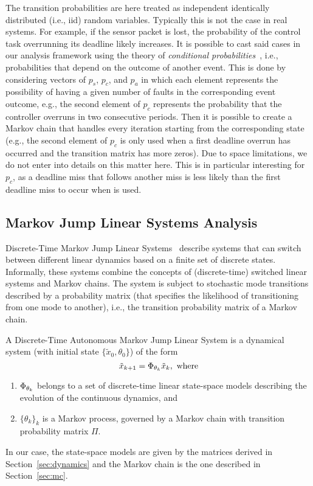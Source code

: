 The transition probabilities are here treated as independent identically distributed (i.e., iid) random variables.
Typically this is not the case in real systems.
For example, if the sensor packet is lost, the probability of the control task overrunning its deadline likely increases.
It is possible to cast said cases in our analysis framework using the theory of \emph{conditional probabilities}~\cite{Dekking:2006}, i.e., probabilities that depend on the outcome of another event.
This is done by considering vectors of $p_s$, $p_c$, and $p_a$ in which each element represents the possibility of having a given number of faults in the corresponding event outcome, e.g., the second element of $p_c$ represents the probability that the controller overruns in two consecutive periods.
Then it is possible to create a Markov chain that handles every iteration starting from the corresponding state (e.g., the second element of $p_c$ is only used when a first deadline overrun has occurred and the transition matrix has more zeros).
Due to space limitations, we do not enter into details on this matter here.
This is in particular interesting for $p_c$, as a deadline miss that follows another miss is less likely than the first deadline miss to occur when \tS{} is used.

\subsection{Markov Jump Linear Systems Analysis}%
\label{sec:mjls}%

Discrete-Time Markov Jump Linear Systems~\cite{Costa:2005} describe systems that can switch between different linear dynamics based on a finite set of discrete states.
Informally, these systems combine the concepts of (discrete-time) switched linear systems and Markov chains.
The system is subject to stochastic mode transitions described by a probability matrix (that specifies the likelihood of transitioning from one mode to another), i.e., the transition probability matrix of a Markov chain.
%
\begin{definition}%
    \label{def:mjls}%
    A Discrete-Time Autonomous Markov Jump Linear System is a dynamical system (with initial state $\{\tilde{x}_0, \theta_0\}$) of the form
    \begin{equation*}
        \tilde{x}_{k+1} = \Phi_{\theta_k} \tilde{x}_k,\text{  where}
    \end{equation*}
    \begin{enumerate}[label=(\roman*)]
        \item $\Phi_{\theta_k}$ belongs to a set of discrete-time linear state-space models describing the evolution of the continuous dynamics, and
        \item $\{\theta_k\}_k$ is a Markov process, governed by a Markov chain with transition probability matrix $\Pi$.
    \end{enumerate}
\end{definition}
%
In our case, the state-space models are given by the matrices derived in Section~\ref{sec:dynamics} and the Markov chain is the one described in Section~\ref{sec:mc}.

